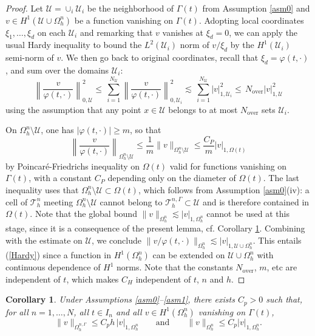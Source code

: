 \documentclass[11pt,a4paper]{article}
\theoremstyle{plain}
\newtheorem{corollary}[theorem]{Corollary}%
\theoremstyle{definition}
\theoremstyle{remark}
\numberwithin{equation}{section}
\begin{document}
\begin{proof}
Let $\mathcal{U}=\cup_i \mathcal{U}_i$ be the neighborhood of $\Gamma(t)$ from Assumption \ref{asm0} and $v\in H^1(\mathcal{U}\cup\Omega^n_h)$ be a function vanishing on $\Gamma(t)$. Adopting local coordinates $\xi_1,\ldots,\xi_d$ on each $\mathcal{U}_i$ and remarking that $v$ vanishes at $\xi_d=0$, we can apply the usual Hardy inequality to bound the $L^2(\mathcal{U}_i)$ norm of $v/\xi_d$ by the $H^1(\mathcal{U}_i)$ semi-norm of $v$. We then go back to original coordinates, recall that $\xi_d=\varphi(t,\cdot)$, and sum over the domains $\mathcal{U}_i$:
$$
\left\| \frac{v}{\varphi(t,\cdot)} \right\|_{0,\mathcal{U}}^2
\le \, \sum_{i=1}^{N_{\mathcal{U}}} \left\| \frac{v}{\varphi(t,\cdot)} \right\|_{0,\mathcal{U}_i}^2
\lesssim  \, \sum_{i=1}^{N_{\mathcal{U}}} |v|_{1,\mathcal{U}_i}^2
\le  \, N_{\text{over}} |v|_{1,\mathcal{U}}^2
$$
using the assumption that any point $x\in\mathcal{U}$ belongs to at most $N_{\text{over}}$ sets $\mathcal{U}_i$.

On $\Omega_h^n\setminus\mathcal{U}$, one has $|\varphi(t,\cdot)|\geqslant m$, so that $$\left\| \frac{v}{\varphi(t,\cdot)} \right\|_{\Omega_h^n\setminus\mathcal{U}}\leqslant \frac1m\|v\|_{\Omega_h^n\setminus\mathcal{U}}\leqslant \frac{C_P}{m}|v|_{1,\Omega(t)}$$ 
by Poincaré-Friedrichs inequality on $\Omega(t)$ valid for functions vanishing on $\Gamma(t)$,  with a constant $C_P$ depending only on the diameter of   $\Omega(t)$. The last inequality uses that $\Omega_h^n\setminus\mathcal{U}\subset\Omega(t)$, which follows from Assumption \ref{asm0}(iv): a cell of $\mathcal{T}_h^n$ meeting $\Omega_h^n\setminus\mathcal{U}$ cannot belong to $\mathcal{T}_h^{n,\Gamma}\subset\mathcal{U}$ and is therefore contained in $\Omega(t)$. Note that the global bound $\|v\|_{\Omega_h^n}\lesssim|v|_{1,\Omega_h^n}$ cannot be used at this stage, since it is a consequence of the present lemma, cf. Corollary \ref{LemPoin}.
Combining with the estimate on $\mathcal{U}$, we conclude $\|v/\varphi(t,\cdot)\|_{\Omega_h^n}\lesssim |v|_{1,\mathcal{U}\cup\Omega_h^n}$. This entails (\ref{Hardy}) since a function in $H^1(\Omega^n_h)$ can be extended on $\mathcal{U}\cup\Omega^n_h$ with continuous dependence of $H^1$ norms. Note that the constants $N_\text{over}$, $m$, etc are independent of $t$, which makes $C_H$ independent of $t$, $n$ and $h$.
\end{proof}

\begin{corollary}\label{LemPoin}
	{Under Assumptions \ref{asm0}--\ref{asm1}, there exists $C_p>0$ such that, for all $n=1,\ldots,N$, all $t\in I_n$ and all $v\in H^1(\Omega_h^n)$ vanishing on $\Gamma(t)$,}
	\begin{equation}\label{Poin}
			\|v\|_{\Omega_h^{n,\Gamma}} \leqslant C_p h\, |v|_{1,\Omega_h^n}  
			\qquad\text{and}\qquad
			\|v\|_{\Omega_h^n} \leqslant C_p |v|_{1,\Omega_h^n}.
	\end{equation}
\end{corollary}
\end{document}
